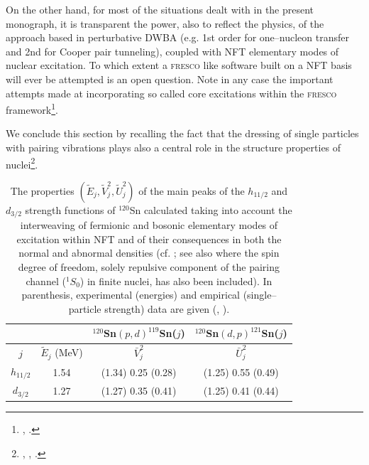   
  On the other hand, for most of the situations dealt with in the present monograph, it is transparent the power, also to reflect the physics, of the approach based in perturbative DWBA (e.g. 1st order for one--nucleon transfer and 2nd for Cooper pair tunneling), coupled  
  with NFT elementary modes of nuclear excitation.
  To which extent a \textsc{fresco} like software built on a NFT basis will ever be attempted is an open question. Note in any case the important attempts made at incorporating so called core excitations within the \textsc{fresco} framework\footnote{\cite{Fernandez:10}, \cite{Fernandez:10b}.}. 
  
  
  We conclude this section by recalling the fact that the dressing of single particles with pairing vibrations plays also a central role in the structure properties of nuclei\footnote{\cite{Barranco:87b}, \cite{Bes:88}, \cite{Baroni:04}.}.
  
  
  \begin{table}
  \centering
  \begin{tabular}{|c|c|c|c|}
  \hline  &  & $^{120}$Sn$(p,d)^{119}$Sn($j$) & $^{120}$Sn$(d,p)^{121}$Sn($j$) \\ 
  \hline $j$ & $\tilde E_j$ (MeV) & $\bar V_j^2$ & $\bar U_j^2$ \\ 
  \hline $h_{11/2}$ & 1.54 &  (1.34) 0.25 (0.28) & (1.25) 0.55 (0.49) \\ 
  \hline $d_{3/2}$ & 1.27  & (1.27) 0.35 (0.41) & (1.25) 0.41 (0.44)  \\ 
  \hline 
  \end{tabular}\caption{The properties $(\tilde E_j,\tilde V^2_j, \tilde U_j^2)$ of the main peaks of the $h_{11/2}$ and $d_{3/2}$ strength functions of $^{120}$Sn calculated taking into account the interweaving of fermionic and bosonic elementary modes of excitation within NFT and of their consequences in both the normal and abnormal densities (cf. \cite{Idini:12}; \cite{Idini:13} see also \cite{Idini:15} where the spin degree of freedom, solely repulsive component of the pairing channel ($^1S_0$) in finite nuclei, has also been included). In parenthesis, experimental (energies) and empirical (single--particle strength) data are given (\cite{Bechara:75}, \cite{Dickey:82}).}\label{tab6.2.1}
  \end{table}

